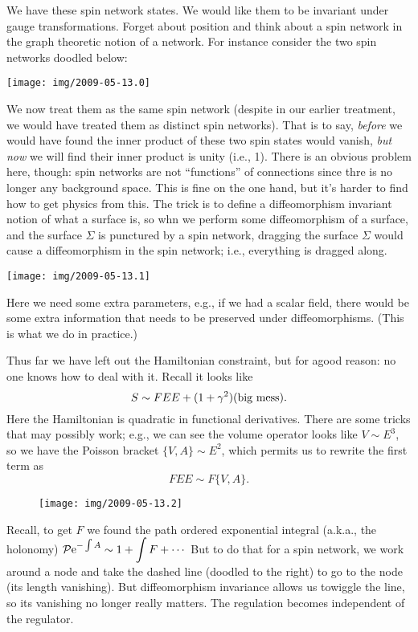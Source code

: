 We have these spin network states. We would like them to be invariant
under gauge transformations. Forget about position and think about a
spin network in the graph theoretic notion of a network. For instance
consider the two spin networks doodled below:
\begin{center}
\texttt{[image: img/2009-05-13.0]}
\end{center}
We now treat them as the same spin network (despite in our earlier
treatment, we would have treated them as distinct spin networks).
That is to say, \emph{before} we would have found the inner product of
these two spin states would vanish, \emph{but now} we will find their
inner product is unity (i.e., 1). There is an obvious problem here,
though: spin networks are not ``functions'' of connections since thre is
no longer any background space. This is fine on the one hand, but it's
harder to find how to get physics from this. The trick is to define a
diffeomorphism invariant notion of what a surface is, so whn we perform
some diffeomorphism of a surface, and the surface $\Sigma$ is punctured
by a spin network, dragging the surface $\Sigma$ would cause a
diffeomorphism in the spin network; i.e., everything is dragged along.
\begin{center}
\texttt{[image: img/2009-05-13.1]}
\end{center}
Here we need some extra parameters, e.g., if we had a scalar field,
there would be some extra information that needs to be preserved under
diffeomorphisms. (This is what we do in practice.)

Thus far we have left out the Hamiltonian constraint, but for agood
reason: no one knows how to deal with it. Recall it looks like
\begin{equation}
S\sim FEE + (1+\gamma^{2})(\mbox{big mess}).
\end{equation}
Here the Hamiltonian is quadratic in functional derivatives. There are
some tricks that may possibly work; e.g., we can see the volume operator
looks like $V\sim E^{3}$, so we have the Poisson bracket $\{V,A\}\sim E^{2}$,
which permits us to rewrite the first term as
\begin{equation}
FEE\sim F\{V,A\}.
\end{equation}

\begin{wrapfigure}{R}{5pc}
\centering\vskip-1pc
\texttt{[image: img/2009-05-13.2]}
\end{wrapfigure}
Recall, to get $F$ we found the path ordered exponential integral
(a.k.a., the holonomy)
$\displaystyle \mathcal{P}\mathrm{e}^{-\int A}\sim 1 + \int F + \cdots$
But to do that for a spin network, we work around a node and take the
dashed line (doodled to the right) to go to the node (its length
vanishing). But diffeomorphism invariance allows us towiggle the line,
so its vanishing no longer really matters. The regulation becomes
independent of the regulator.


